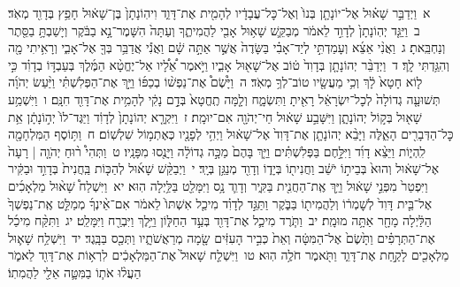 \documentclass[18pt]{article}
\begin{document}
\startlock
 {\loc א~}וַיְדַבֵּ֣ר שָׁא֗וּל אֶל־יוֹנָתָ֤ן בְּנוֹ֙ וְאֶל־כׇּל־עֲבָדָ֔יו לְהָמִ֖ית אֶת־דָּוִ֑ד וִיהֽוֹנָתָן֙ בֶּן־שָׁא֔וּל חָפֵ֥ץ בְּדָוִ֖ד מְאֹֽד׃ \startlock
 {\loc ב~}וַיַּגֵּ֤ד יְהֽוֹנָתָן֙ לְדָוִ֣ד לֵאמֹ֔ר מְבַקֵּ֛שׁ שָׁא֥וּל אָבִ֖י לַהֲמִיתֶ֑ךָ וְעַתָּה֙ הִשָּׁמֶר־נָ֣א בַבֹּ֔קֶר וְיָשַׁבְתָּ֥ בַסֵּ֖תֶר וְנַחְבֵּֽאתָ׃ \startlock
 {\loc ג~}וַאֲנִ֨י אֵצֵ֜א וְעָמַדְתִּ֣י לְיַד־אָבִ֗י בַּשָּׂדֶה֙ אֲשֶׁ֣ר אַתָּ֣ה שָׁ֔ם וַאֲנִ֕י אֲדַבֵּ֥ר בְּךָ֖ אֶל־אָבִ֑י וְרָאִ֥יתִי מָ֖ה וְהִגַּ֥דְתִּי לָֽךְ׃ \startlock
 {\loc ד~}וַיְדַבֵּ֨ר יְהוֹנָתָ֤ן בְּדָוִד֙ ט֔וֹב אֶל־שָׁא֖וּל אָבִ֑יו וַיֹּ֣אמֶר אֵ֠לָ֠יו אַל־יֶחֱטָ֨א הַמֶּ֜לֶךְ בְּעַבְדּ֣וֹ בְדָוִ֗ד כִּ֣י ל֤וֹא חָטָא֙ לָ֔ךְ וְכִ֥י מַעֲשָׂ֖יו טוֹב־לְךָ֥ מְאֹֽד׃ \startlock
 {\loc ה~}וַיָּ֩שֶׂם֩ אֶת־נַפְשׁ֨וֹ בְכַפּ֜וֹ וַיַּ֣ךְ אֶת־הַפְּלִשְׁתִּ֗י וַיַּ֨עַשׂ יְהֹוָ֜ה תְּשׁוּעָ֤ה גְדוֹלָה֙ לְכׇל־יִשְׂרָאֵ֔ל רָאִ֖יתָ וַתִּשְׂמָ֑ח וְלָ֤מָּה תֶֽחֱטָא֙ בְּדָ֣ם נָקִ֔י לְהָמִ֥ית אֶת־דָּוִ֖ד חִנָּֽם׃ \startlock
 {\loc ו~}וַיִּשְׁמַ֥ע שָׁא֖וּל בְּק֣וֹל יְהוֹנָתָ֑ן וַיִּשָּׁבַ֣ע שָׁא֔וּל חַי־יְהֹוָ֖ה אִם־יוּמָֽת׃ \startlock
 {\loc ז~}וַיִּקְרָ֤א יְהוֹנָתָן֙ לְדָוִ֔ד וַיַּגֶּד־לוֹ֙ יְה֣וֹנָתָ֔ן אֵ֥ת כׇּל־הַדְּבָרִ֖ים הָאֵ֑לֶּה וַיָּבֵ֨א יְהוֹנָתָ֤ן אֶת־דָּוִד֙ אֶל־שָׁא֔וּל וַיְהִ֥י לְפָנָ֖יו כְּאֶתְמ֥וֹל שִׁלְשֽׁוֹם׃ \startlock
 {\loc ח~}וַתּ֥וֹסֶף הַמִּלְחָמָ֖ה לִֽהְי֑וֹת וַיֵּצֵ֨א דָוִ֜ד וַיִּלָּ֣חֶם בַּפְּלִשְׁתִּ֗ים וַיַּ֤ךְ בָּהֶם֙ מַכָּ֣ה גְדוֹלָ֔ה וַיָּנֻ֖סוּ מִפָּנָֽיו׃ \startlock
 {\loc ט~}וַתְּהִי֩ ר֨וּחַ יְהֹוָ֤ה  |  רָעָה֙ אֶל־שָׁא֔וּל וְהוּא֙ בְּבֵית֣וֹ יֹשֵׁ֔ב וַחֲנִית֖וֹ בְּיָד֑וֹ וְדָוִ֖ד מְנַגֵּ֥ן בְּיָֽד׃ \startlock
 {\loc י~}וַיְבַקֵּ֨שׁ שָׁא֜וּל לְהַכּ֤וֹת בַּֽחֲנִית֙ בְּדָוִ֣ד וּבַקִּ֔יר וַיִּפְטַר֙ מִפְּנֵ֣י שָׁא֔וּל וַיַּ֥ךְ אֶֽת־הַחֲנִ֖ית בַּקִּ֑יר וְדָוִ֛ד נָ֥ס וַיִּמָּלֵ֖ט בַּלַּ֥יְלָה הֽוּא׃ \startlock
 {\loc יא~}וַיִּשְׁלַח֩ שָׁא֨וּל מַלְאָכִ֜ים אֶל־בֵּ֤ית דָּוִד֙ לְשׇׁמְר֔וֹ וְלַהֲמִית֖וֹ בַּבֹּ֑קֶר וַתַּגֵּ֣ד לְדָוִ֗ד מִיכַ֤ל אִשְׁתּוֹ֙ לֵאמֹ֔ר אִם־אֵ֨ינְךָ֜ מְמַלֵּ֤ט אֶֽת־נַפְשְׁךָ֙ הַלַּ֔יְלָה מָחָ֖ר אַתָּ֥ה מוּמָֽת׃ \startlock
 {\loc יב~}וַתֹּ֧רֶד מִיכַ֛ל אֶת־דָּוִ֖ד בְּעַ֣ד הַחַלּ֑וֹן וַיֵּ֥לֶךְ וַיִּבְרַ֖ח וַיִּמָּלֵֽט׃ \startlock
 {\loc יג~}וַתִּקַּ֨ח מִיכַ֜ל אֶת־הַתְּרָפִ֗ים וַתָּ֙שֶׂם֙ אֶל־הַמִּטָּ֔ה וְאֵת֙ כְּבִ֣יר הָעִזִּ֔ים שָׂ֖מָה מְרַאֲשֹׁתָ֑יו וַתְּכַ֖ס בַּבָּֽגֶד׃ \startlock
 {\loc יד~}וַיִּשְׁלַ֥ח שָׁא֛וּל מַלְאָכִ֖ים לָקַ֣חַת אֶת־דָּוִ֑ד וַתֹּ֖אמֶר חֹלֶ֥ה הֽוּא׃ \startlock
 {\loc טו~}וַיִּשְׁלַ֤ח שָׁאוּל֙ אֶת־הַמַּלְאָכִ֔ים לִרְא֥וֹת אֶת־דָּוִ֖ד לֵאמֹ֑ר הַעֲל֨וּ אֹת֧וֹ בַמִּטָּ֛ה אֵלַ֖י לַהֲמִתֽוֹ׃ \startlock
\end{document}
